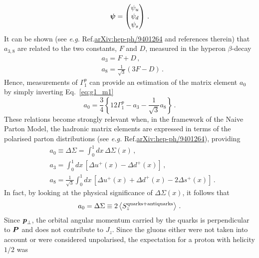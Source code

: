 \begin{equation}
  \vb*{\psi} = \left(\begin{matrix}
    \psi_{u} \\
    \psi_{d} \\
    \psi_{s} 
  \end{matrix}\right) \,.
\end{equation}
It can be shown (see \textit{e.g.} Ref.\href{https://arxiv.org/abs/hep-ph/9401264}{arXiv:hep-ph/9401264} and references therein) that $a_{3,8}$ are related to the two constants, $F$ and $D$, measured in the hyperon $\beta$-decay
\begin{align}
  & a_3 = F + D \,, \\
  & a_8 = \frac{1}{\sqrt{3}} (3F - D)\,.
\end{align}
Hence, measurements of $\Gamma_{1}^{p}$ can provide an estimation of the matrix element $a_0$ by simply inverting Eq.~\eqref{eq:g1_m1}
\begin{equation}
  a_0 =  \frac{3}{4} \left\{ 12 \Gamma_{1}^p - a_3 - \frac{1}{\sqrt{3}} a_8 \right\}\,.
\end{equation}
These relations become strongly relevant when, in the framework of the Naive Parton Model, the hadronic matrix elements are expressed in terms of the polarised parton distributions (see \textit{e.g.} Ref.\href{https://arxiv.org/abs/hep-ph/9401264}{arXiv:hep-ph/9401264}), providing
\begin{align}
  & a_0 \equiv \Delta \Sigma = \int_{0}^{1} dx \, \Delta \Sigma(x) \,, 
  \label{eq:a0_NPM}
  \\
  & a_3 = \int_{0}^{1} dx \, \left[ \Delta u^{+}(x) - \Delta d^{+}(x) \right] \,,
  \label{eq:a3_PM}
  \\
  & a_8 = \frac{1}{\sqrt{3}}\int_{0}^{1} dx \, \left[ \Delta u^{+}(x) + \Delta d^{+}(x) - 2 \Delta s^{+}(x) \right] \,.
  \label{eq:a8_PM}
\end{align}
In fact, by looking at the physical significance of $\Delta \Sigma (x)$, it follows that
\begin{equation}
  a_0 = \Delta \Sigma \equiv 2 \left< S_{z}^{\textrm{quarks} + \textrm{antiquarks}} \right> \,.
  \label{eq:a0_Sz}
\end{equation}
Since $\vb*{p}_{\perp}$, the orbital angular momentum carried by the quarks is perpendicular to $\vb*{P}$ and does not contribute to $J_{z}$. Since the gluons either were not taken into account or were considered unpolarised, the expectation for a proton with helicity $1/2$ was 
